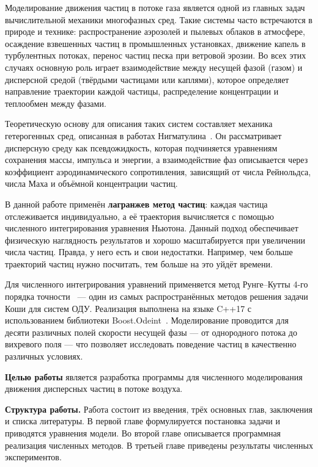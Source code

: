 \documentclass[14pt,a4paper]{extarticle}
\numberwithin{figure}{section}
\numberwithin{table}{section}
\begin{document}
Моделирование движения частиц в потоке газа является одной из
главных задач вычислительной механики многофазных сред. Такие системы
часто встречаются в природе и технике: распространение аэрозолей и пылевых облаков
в атмосфере, осаждение взвешенных частиц в промышленных установках, движение
капель в турбулентных потоках, перенос частиц песка при ветровой эрозии.
Во всех этих случаях основную роль играет взаимодействие между несущей фазой
(газом) и дисперсной средой (твёрдыми частицами или каплями), которое определяет
направление траектории каждой частицы, распределение концентрации и теплообмен между фазами.

Теоретическую основу для описания таких систем составляет механика гетерогенных
сред, описанная в работах Нигматулина~\cite{Nigmatulin1978, Nigmatulin1987}.
Он рассматривает дисперсную среду как псевдожидкость,
которая подчиняется уравнениям сохранения массы, импульса и энергии, а взаимодействие
фаз описывается через коэффициент аэродинамического сопротивления, зависящий
от числа Рейнольдса, числа Маха и объёмной концентрации частиц.

В данной работе применён \textbf{лагранжев метод частиц}:
каждая частица отслеживается индивидуально,
а её траектория вычисляется с помощью численного интегрирования уравнения Ньютона.
Данный подход обеспечивает физическую наглядность результатов и хорошо
масштабируется при увеличении числа частиц. Правда, у него есть и свои недостатки. Например,
чем больше траекторий частиц нужно посчитать, тем больше на это уйдёт времени.

Для численного интегрирования уравнений применяется метод
Рунге--Кутты 4-го порядка точности~\cite{HairerRK} --- один из самых
распространённых методов решения задачи Коши для систем ОДУ.
Реализация выполнена на языке C++17 с использованием библиотеки
Boost.Odeint~\cite{BoostOdeint}. Моделирование проводится для десяти различных
полей скорости несущей фазы --- от однородного потока до вихревого поля ---
что позволяет исследовать поведение частиц в качественно различных условиях.

\textbf{Целью работы} является разработка программы для численного
моделирования движения дисперсных частиц в потоке воздуха.

\textbf{Структура работы.} Работа состоит из введения, трёх основных глав,
заключения и списка литературы. В первой главе формулируется постановка задачи
и приводятся уравнения модели. Во второй главе описывается программная реализация
численных методов. В третьей главе приведены результаты численных
экспериментов.
\end{document}
